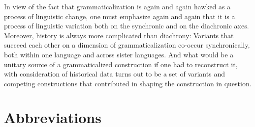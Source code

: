 \documentclass[output=paper]{langsci/langscibook}
\begin{document}
In view of the fact that grammaticalization is again and again hawked as a process of linguistic change, one must emphasize again and again that it is a process of linguistic variation both on the synchronic and on the diachronic axes. Moreover, history is always more complicated than diachrony: Variants that succeed each other on a dimension of grammaticalization co-occur synchronically, both within one language and across sister languages. And what would be a unitary source of a grammaticalized construction if one had to reconstruct it, with consideration of historical data turns out to be a set of variants and competing constructions that contributed in shaping the construction in question.

\section*{Abbreviations} 
\end{document}
